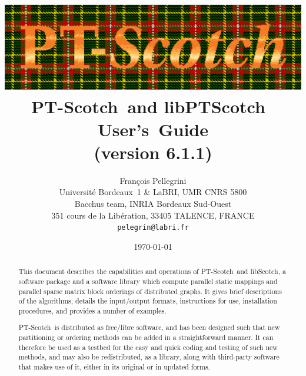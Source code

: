 \documentclass{article}
\newcommand{\libscotch}{{\sc libScotch}}         %
\newcommand{\ptscotch}{{\sc PT-Scotch}}          %
\newcommand{\libptscotch}{{\sc libPTScotch}}     %
\newcommand{\scotchver}{6.1}
\newcommand{\scotchversub}{6.1.1}
\begin{document}
\date{\today}

\title{\includegraphics[scale=0.8]{../misc/ptscotch_logo_color.ps}\\[1em]
       {\LARGE\bf \ptscotch\ and \libptscotch\ {\sc \scotchver} \mbox{User's Guide}}\\[1em]%
       {\normalsize (version \scotchversub)}
}

\author{Fran\c cois Pellegrini\\
Universit\'e Bordeaux~1 \& LaBRI, UMR CNRS 5800\\
Bacchus team, INRIA Bordeaux Sud-Ouest\\
351 cours de la Lib\'eration, 33405 TALENCE, FRANCE\\
{\tt pelegrin@labri.fr}}

\maketitle

\begin{abstract}

This document describes the capabilities and operations of
\ptscotch\ and \libscotch, a software package and a software library
which compute parallel static mappings and parallel sparse matrix
block orderings of distributed graphs. It gives brief descriptions of
the algorithms, details the input/output formats, instructions for
use, installation procedures, and provides a number of examples.

\ptscotch\ is distributed as free/libre software, and has been
designed such that new partitioning or ordering methods can be added
in a straightforward manner. It can therefore be used as a testbed for
the easy and quick coding and testing of such new methods, and may
also be redistributed, as a library, along with third-party software
that makes use of it, either in its original or in updated forms.
\end{abstract}

\clearpage


\tableofcontents
\end{document}
